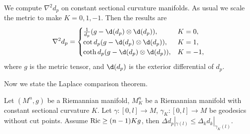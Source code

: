 \begin{eg}
    We compute $\nabla^2d_p$ on constant sectional curvature manifolds.
    As usual we scale the metric to make $K=0,1,-1$.
    Then the results are
    \[\nabla^2d_p=\begin{cases}
        \frac{1}{d_p}(g-\d(d_p)\otimes\d(d_p)), & K=0,\\
        \cot{d_p}(g-\d(d_p)\otimes\d(d_p)), & K=1,\\
        \coth{d_p}(g-\d(d_p)\otimes\d(d_p)), & K=-1,
    \end{cases}\]
    where $g$ is the metric tensor, and $\d(d_p)$ is the exterior differential of $d_p$.
\end{eg}

Now we state the Laplace comparison theorem.
\begin{thm}
    Let $(M^n,g)$ be a Riemannian manifold, $M_K^n$ be a Riemannian manifold with constant sectional curvature $K$.
    Let $\gamma:[0,l]\to M$, $\gamma_K:[0,l]\to M$ be geodesics without cut points.
    Assume $\operatorname{Ric}\geq(n-1)Kg$, then $\Delta d_p|_{\gamma(l)}\leq\Delta_kd_k|_{\gamma_K(l)}$.
\end{thm}

